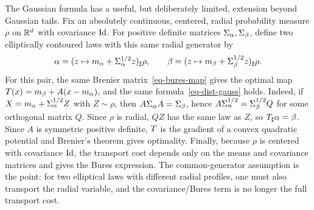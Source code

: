\begin{rem}\label{rem-elliptical-bures}
	The Gaussian formula has a useful, but deliberately limited, extension beyond Gaussian tails. Fix an absolutely continuous, centered, radial probability measure $\rho$ on $\mathbb{R}^d$ with covariance $\mathrm{Id}$. For positive definite matrices $\Sigma_\alpha,\Sigma_\beta$, define two elliptically contoured laws with this same radial generator by
	\[
		\alpha=(z\mapsto m_\alpha+\Sigma_\alpha^{1/2}z)_\sharp\rho,
		\qquad
		\beta=(z\mapsto m_\beta+\Sigma_\beta^{1/2}z)_\sharp\rho.
	\]
	For this pair, the same Brenier matrix~\eqref{eq-bures-map} gives the optimal map $T(x)=m_\beta+A(x-m_\alpha)$, and the same formula~\eqref{eq-dist-gauss} holds. Indeed, if $X=m_\alpha+\Sigma_\alpha^{1/2}Z$ with $Z\sim\rho$, then $A\Sigma_\alpha A=\Sigma_\beta$, hence $A\Sigma_\alpha^{1/2}=\Sigma_\beta^{1/2}Q$ for some orthogonal matrix $Q$. Since $\rho$ is radial, $QZ$ has the same law as $Z$, so $T_\sharp\alpha=\beta$. Since $A$ is symmetric positive definite, $T$ is the gradient of a convex quadratic potential and Brenier's theorem gives optimality. Finally, because $\rho$ is centered with covariance $\mathrm{Id}$, the transport cost depends only on the means and covariance matrices and gives the Bures expression. The common-generator assumption is the point: for two elliptical laws with different radial profiles, one must also transport the radial variable, and the covariance/Bures term is no longer the full transport cost.
\end{rem}


